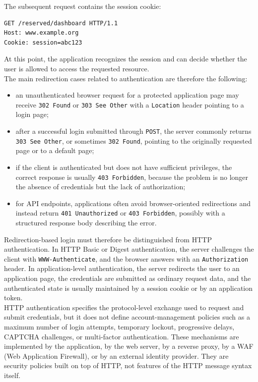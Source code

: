 \documentclass{scrbook}
\begin{document}
The subsequent request contains the session cookie:

\begin{lstlisting}
GET /reserved/dashboard HTTP/1.1
Host: www.example.org
Cookie: session=abc123
\end{lstlisting}

At this point, the application recognizes the session and can decide whether the user is allowed to access the requested resource.\\

The main redirection cases related to authentication are therefore the following:

\begin{itemize}
	\item an unauthenticated browser request for a protected application page
	may receive \texttt{302 Found} or \texttt{303 See Other} with a
	\texttt{Location} header pointing to a login page;
	
	\item after a successful login submitted through \texttt{POST}, the server
	commonly returns \texttt{303 See Other}, or sometimes \texttt{302 Found},
	pointing to the originally requested page or to a default page;
	
	\item if the client is authenticated but does not have sufficient
	privileges, the correct response is usually \texttt{403 Forbidden}, because
	the problem is no longer the absence of credentials but the lack of
	authorization;
	
	\item for API endpoints, applications often avoid browser-oriented
	redirections and instead return \texttt{401 Unauthorized} or
	\texttt{403 Forbidden}, possibly with a structured response body describing
	the error.
\end{itemize}

Redirection-based login must therefore be distinguished from HTTP authentication. In HTTP Basic or Digest authentication, the server challenges the client with \texttt{WWW-Authenticate}, and the browser answers with an \texttt{Authorization} header. In application-level authentication, the server redirects the user to an application page, the credentials are submitted as ordinary request data, and the authenticated state is usually maintained by a session cookie or by an application token.\\

HTTP authentication specifies the protocol-level exchange used to request and submit credentials, but it does not define account-management policies such as a maximum number of login attempts, temporary lockout, progressive delays, CAPTCHA challenges, or multi-factor authentication. These mechanisms are implemented by the application, by the web server, by a reverse proxy, by a WAF (Web Application Firewall), or by an external identity provider. They are security policies built on top of HTTP, not features of the HTTP message syntax itself.
\end{document}
